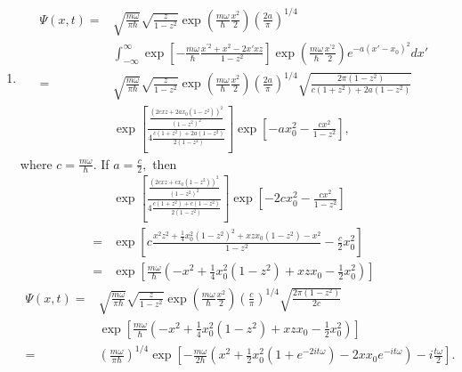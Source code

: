 \begin{enumerate}
    \item 
    \begin{align*}
        \Psi(x,t)=&\sqrt{\frac{m\omega}{\pi\hbar}}
        \sqrt{\frac{z}{1-z^2}}
        \exp\left(
        \frac{m\omega}{\hbar}
        \frac{x^{2}}{2}
        \right)
        \left(\frac{2a}{\pi}\right)^{1/4}\\
        &\int_{-\infty}^\infty
       \exp\left[
        -\frac{m\omega}{\hbar}
        \frac{x^{'2}+x^2-2x'xz}{1-z^2}
        \right]
        \exp\left(
        \frac{m\omega}{\hbar}
        \frac{x^{'2}}{2}
        \right)
        e^{-a(x'-x_0)^2}dx'\\
        =&
       \sqrt{\frac{m\omega}{\pi\hbar}}
        \sqrt{\frac{z}{1-z^2}}
        \exp\left(
        \frac{m\omega}{\hbar}
        \frac{x^{2}}{2}
        \right)
        \left(\frac{2a}{\pi}\right)^{1/4}
        \sqrt{\frac{2\pi(1-z^2)}{c(1+z^2)+2a(1-z^2)}}\\
        &
        \exp\left[
        \frac{
        \frac{(2cxz+2ax_0(1-z^2))^2}{(1-z^2)^2}
        }
        {4 \frac{c(1+z^2)+2a(1-z^2)}{2(1-z^2)}}
        \right]
        \exp\left[
        -ax_0^2 - \frac{cx^2}{1-z^2}
        \right],
    \end{align*}
    where $c=\frac{m\omega}{\hbar}.$ If $a=\frac{c}{2},$ then 
    \begin{align*}
        &\exp\left[
        \frac{
        \frac{(2cxz+cx_0(1-z^2))^2}{(1-z^2)^2}
        }
        {4 \frac{c(1+z^2)+c(1-z^2)}{2(1-z^2)}}
        \right]
        \exp\left[
        -2cx_0^2 - \frac{cx^2}{1-z^2}
        \right]\\
        =&
        \exp\left[
        c
        \frac{
        x^2z^2
        +\frac{1}{4}x_0^2(1-z^2)^2
        +xzx_0(1-z^2)
        -x^2}{1-z^2}
        -\frac{c}{2}x_0^2
        \right]\\
        =&
        \exp\left[
        \frac{m\omega}{\hbar}
        \left(-x^2
        +
        \frac{1}{4}x_0^2(1-z^2)
        +xzx_0
        -\frac{1}{2}x_0^2
        \right)
        \right]
    \end{align*}
    \begin{align*}
        \Psi(x,t)
        =&
        \sqrt{\frac{m\omega}{\pi\hbar}}
        \sqrt{\frac{z}{1-z^2}}
        \exp\left(
        \frac{m\omega}{\hbar}
        \frac{x^{2}}{2}
        \right)
        \left(\frac{c}{\pi}\right)^{1/4}
        \sqrt{\frac{2\pi(1-z^2)}{2c}}\\
        &\exp\left[
        \frac{m\omega}{\hbar}
        \left(-x^2
        +
        \frac{1}{4}x_0^2(1-z^2)
        +xzx_0
        -\frac{1}{2}x_0^2
        \right)
        \right]\\
        =&
        \left(
        \frac{m\omega}{\pi\hbar}
        \right)^{1/4}
        \exp\left[
        -\frac{m\omega}{2\hbar}
        \left(x^2
        +
        \frac{1}{2}x_0^2(1+e^{-2it\omega})
        -2xx_0e^{-it\omega}
        \right)
        -i\frac{t\omega}{2}
        \right].
    \end{align*}



\end{enumerate}
